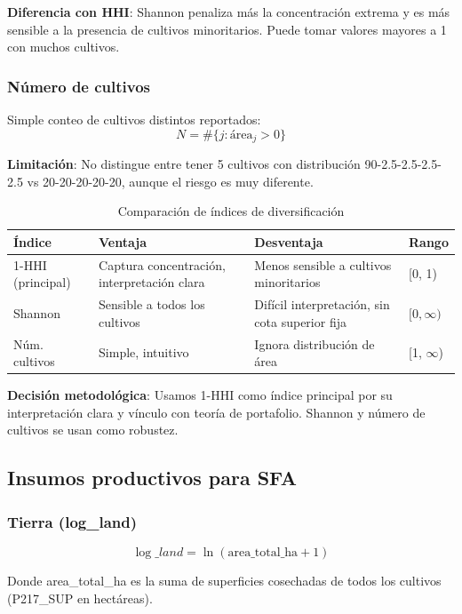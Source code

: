 \documentclass[11pt,a4paper]{article}
\begin{document}
\textbf{Diferencia con HHI}: Shannon penaliza más la concentración extrema y es más sensible a la presencia de cultivos minoritarios. Puede tomar valores mayores a 1 con muchos cultivos.

\subsubsection{Número de cultivos}
Simple conteo de cultivos distintos reportados:
\[
N = \#\{j : \text{área}_j > 0\}
\]

\textbf{Limitación}: No distingue entre tener 5 cultivos con distribución 90-2.5-2.5-2.5-2.5 vs 20-20-20-20-20, aunque el riesgo es muy diferente.

\begin{table}[H]
\centering
\caption{Comparación de índices de diversificación}
\label{tab:index_comparison}
\begin{threeparttable}
\small
\begin{tabular}{p{3cm}p{4cm}p{4cm}p{2.5cm}}
\toprule
\textbf{Índice} & \textbf{Ventaja} & \textbf{Desventaja} & \textbf{Rango} \\
\midrule
1-HHI (principal) & Captura concentración, interpretación clara & Menos sensible a cultivos minoritarios & [0, 1) \\
Shannon & Sensible a todos los cultivos & Difícil interpretación, sin cota superior fija & $[0, \infty)$ \\
Núm. cultivos & Simple, intuitivo & Ignora distribución de área & [1, $\infty$) \\
\bottomrule
\end{tabular}
\end{threeparttable}
\end{table}

\textbf{Decisión metodológica}: Usamos 1-HHI como índice principal por su interpretación clara y vínculo con teoría de portafolio. Shannon y número de cultivos se usan como robustez.

\subsection{Insumos productivos para SFA}

\subsubsection{Tierra (log\_land)}
\[
\log\_land = \ln(\text{area\_total\_ha} + 1)
\]

Donde area\_total\_ha es la suma de superficies cosechadas de todos los cultivos (P217\_SUP en hectáreas).
\end{document}
